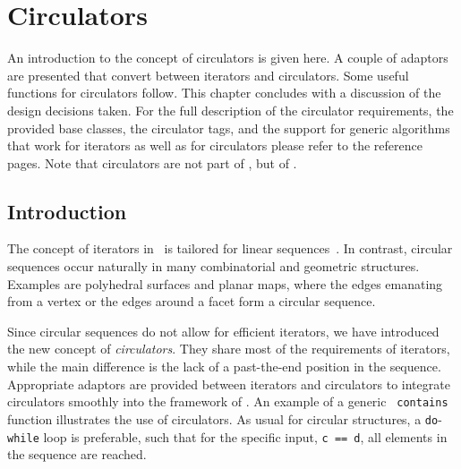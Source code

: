 
\gdef\lciIfHtmlClassLinks{\lcFalse}
\gdef\lciIfHtmlRefLinks{\lcFalse}
\gdef\lciIfHtmlLinks{\lcFalse}

\section{Circulators}


An introduction to the concept of circulators is given here. A couple
of adaptors are presented that convert between iterators and
circulators. Some useful functions for circulators follow. This
chapter concludes with a discussion of the design decisions taken. For
the full description of the circulator requirements, the provided base
classes, the circulator tags, and the support for generic algorithms
that work for iterators as well as for circulators please refer to the
reference pages. Note that circulators are not part of \stl, but of \cgal.

\subsection{Introduction}
\label{sectionIntroduction}
\label{sectionCirculatorWarning}

The concept of iterators in \stl\ is tailored for linear
sequences~\cite{c-isplc-98,ms-strg-96}.  In contrast, circular
sequences occur naturally in many combinatorial and geometric
structures. Examples are polyhedral surfaces and planar maps, where
the edges emanating from a vertex or the edges around a facet form a
circular sequence.

Since circular sequences do not allow for efficient iterators, we have
introduced the new concept of {\em circulators}. They share most of
the requirements of iterators, while the main difference is the lack
of a past-the-end position in the sequence. Appropriate adaptors are
provided between iterators and circulators to integrate circulators
smoothly into the framework of \stl. An example of a generic {\tt
  contains} function illustrates the use of circulators.  As usual for
circular structures, a {\tt do}-{\tt while} loop is preferable, such
that for the specific input, {\tt c == d}, all elements in the
sequence are reached.

